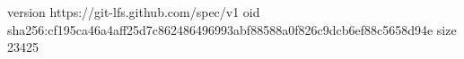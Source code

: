 version https://git-lfs.github.com/spec/v1
oid sha256:cf195ca46a4aff25d7c862486496993abf88588a0f826c9dcb6ef88c5658d94e
size 23425
